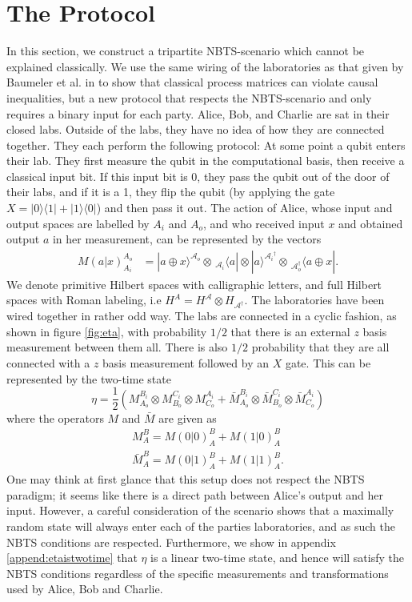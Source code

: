\documentclass[aps,pra, twocolumn]{revtex4-1}
\newcommand{\bra}[1]{\langle #1|}
\newcommand{\ket}[1]{|#1\rangle}
\begin{document}
\section{The Protocol} \label{sec:protocol} 
In this section, we construct a tripartite NBTS-scenario which cannot be explained classically. We  use the same wiring of the laboratories as that given by Baumeler et al. in \cite{Baumeler2014} to show that classical process matrices can violate causal inequalities, but a new protocol that respects the NBTS-scenario  and only requires a binary input for each party. Alice, Bob, and Charlie are sat in their closed labs. Outside of the labs, they have no idea of how they are connected together. They each perform the following protocol:  At some point a qubit enters their lab. They first measure the qubit  in the computational basis, then  receive a classical input bit. If this input bit is 0, they pass the qubit out of the door of their labs, and if it is a 1, they flip the qubit (by applying the gate $X=\ket{0}\bra{1} + \ket{1}\bra{0}$) and then pass it out. The action of Alice, whose input and output spaces are labelled by $A_i$ and $A_o$, and who received input $x$ and obtained output $a$ in her measurement, can be represented by the vectors 
\begin{align}
M(a|x)_{A_i}^{A_o} &= |a\oplus x \rangle^{\mathcal{A}_o} \!\otimes\!\,_{\mathcal{A}_i} \!\langle a |  \otimes |a \rangle^{{\mathcal{A}_i}^\dagger} \!\otimes \!\,_{\mathcal{A}_o^\dagger}\!\langle a \oplus x|.
\end{align}
We denote primitive Hilbert spaces with calligraphic letters, and full Hilbert spaces with Roman labeling, i.e $H^{A}=H^{\mathcal{A}}\otimes H_{\mathcal{A}^\dagger}$. The laboratories have been wired together in rather odd way. The labs are connected in a cyclic fashion, as shown in figure \ref{fig:eta}, with probability $1/2$ that there is an external $z$ basis measurement between them all. There is also $1/2$ probability that they are all connected with a $z$ basis measurement followed by an $X$ gate. This can be represented by the two-time state 
\begin{equation}
\eta = \frac{1}{2}(M_{A_o} ^{B_i}\otimes M_{B_o} ^{C_i} \otimes M_{C_o} ^{A_i} + \bar{M}_{A_o} ^{B_i} \otimes \bar{M}_{B_o} ^{C_i} \otimes \bar{M}_{C_o} ^{A_i})
\end{equation}
where the operators $M$ and $\bar{M}$ are given as
\begin{align}
M_A^B=M(0|0)_A^B + M(1|0)_A^B \\
\bar{M}_A^B=M(0|1)_A^B + M(1|1)_A^B.
\end{align}
One may think at first glance that this setup does not respect the NBTS paradigm; it seems like there is a direct path between Alice's output and her input. However, a careful consideration of the scenario shows that  a maximally random state will always enter each of the parties laboratories, and as such the NBTS conditions are respected. Furthermore, we show in appendix  \ref{append:etaistwotime} that $\eta$ is a linear two-time state, and hence will satisfy the NBTS conditions regardless of the specific measurements and transformations used by Alice, Bob and Charlie. 
\end{document}
